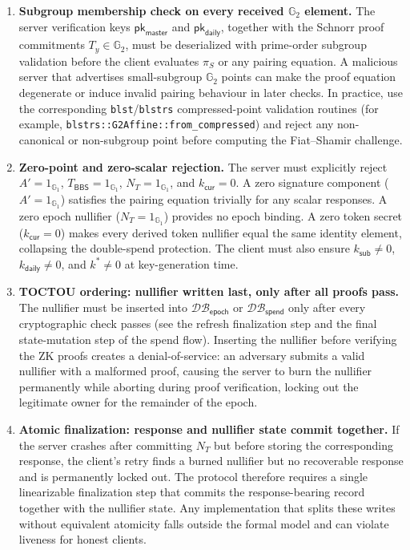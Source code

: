 \documentclass[11pt]{article}
\theoremstyle{definitionstyle}
\theoremstyle{plain}
\newcommand{\DB}{\mathcal{DB}}
\begin{document}
\begin{enumerate}[leftmargin=*,label=\textbf{C\arabic*.}]
\item \textbf{Subgroup membership check on every received $\mathbb{G}_2$ element.}
  The server verification keys $\mathsf{pk}_{\mathsf{master}}$ and
  $\mathsf{pk}_{\mathsf{daily}}$, together with the Schnorr proof commitments
  $T_y \in \mathbb{G}_2$, must be deserialized with prime-order subgroup
  validation before the client evaluates $\pi_S$ or any pairing equation.
  A malicious server that advertises small-subgroup $\mathbb{G}_2$ points can
  make the proof equation degenerate or induce invalid pairing behaviour in
  later checks.  In practice, use the corresponding \texttt{blst}/\texttt{blstrs}
  compressed-point validation routines (for example,
  \texttt{blstrs::G2Affine::from\_compressed}) and reject any non-canonical or
  non-subgroup point before computing the Fiat--Shamir challenge.

\item \textbf{Zero-point and zero-scalar rejection.}
  The server must explicitly reject $A' = 1_{\mathbb{G}_1}$,
  $T_{\mathsf{BBS}} = 1_{\mathbb{G}_1}$, $N_T = 1_{\mathbb{G}_1}$, and
  $k_{\mathsf{cur}} = 0$.  A zero signature component ($A' = 1_{\mathbb{G}_1}$)
  satisfies the pairing equation trivially for any scalar responses.
  A zero epoch nullifier ($N_T = 1_{\mathbb{G}_1}$) provides no epoch binding.
  A zero token secret ($k_{\mathsf{cur}} = 0$) makes every derived token
  nullifier equal the same identity element, collapsing the double-spend
  protection.  The client must also ensure $k_{\mathsf{sub}} \neq 0$,
  $k_{\mathsf{daily}} \neq 0$, and $k^* \neq 0$ at key-generation time.

\item \textbf{TOCTOU ordering: nullifier written last, only after all proofs pass.}
  The nullifier must be inserted into $\DB_{\mathsf{epoch}}$ or
  $\DB_{\mathsf{spend}}$ only after every cryptographic check passes (see the
  refresh finalization step and the final state-mutation step of the spend
  flow).  Inserting the nullifier before verifying
  the ZK proofs creates a denial-of-service: an adversary submits a valid
  nullifier with a malformed proof, causing the server to burn the nullifier
  permanently while aborting during proof verification, locking out the
  legitimate owner for the remainder of the epoch.

\item \textbf{Atomic finalization: response and nullifier state commit together.}
  If the server crashes after committing $N_T$ but before storing the
  corresponding response, the client's retry finds a burned nullifier but no
  recoverable response and is permanently locked out.  The protocol therefore
  requires a single linearizable finalization step that commits the
  response-bearing record together with the nullifier state.  Any
  implementation that splits these writes without equivalent atomicity falls
  outside the formal model and can violate liveness for honest clients.


\end{enumerate}
\end{document}
